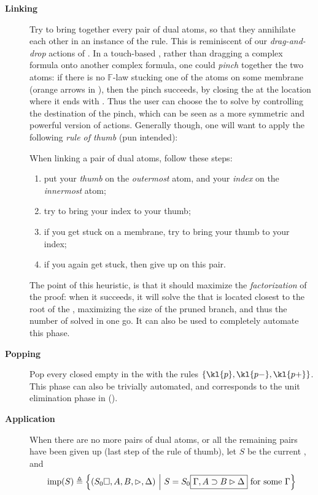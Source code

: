 \begin{description}
  \item[\textbf{Linking}] Try to bring together every pair of dual atoms, so
    that they annihilate each other in an instance of the 
    rule. This is reminiscent of our \emph{drag-and-drop} actions of
    . In a touch-based , rather than dragging a complex formula
    onto another complex formula, one could \emph{pinch} together the two atoms:
    if there is no $\mathbb{F}$-law stucking one of the atoms on some membrane
    (orange arrows in ), then the pinch succeeds, by
    closing the  at the location where it ends with
    . Thus the user can choose the  to solve by
    controlling the destination of the pinch, which can be seen as a more
    symmetric and powerful version of  actions. Generally though, one will
    want to apply the following \emph{rule of thumb} (pun intended):
    \begin{fact}
      When linking a pair of dual atoms, follow these steps:
      \begin{enumerate}
        \item put your \emph{thumb} on the \emph{outermost} atom, and your
              \emph{index} on the \emph{innermost} atom;
        \item try to bring your index to your thumb;
        \item if you get stuck on a membrane, try to bring your thumb to your
              index;
        \item if you again get stuck, then give up on this pair.
      \end{enumerate}
    \end{fact}
    The point of this heuristic, is that it should maximize the
    \emph{factorization} of the proof: when it succeeds, it will solve the
     that is located closest to the root of the , maximizing the size
    of the pruned branch, and thus the number of  solved in one go. It
    can also be used to completely automate this phase.

  \item[\textbf{Popping}] Pop every closed empty  in the  with the
  rules $\{\kl{p},\kl{p{-}},\kl{p{+}}\}$. This phase can also be trivially
  automated, and corresponds to the unit elimination phase in 
  ().

  \item[\textbf{Application}] When there are no more pairs of dual atoms, or all
    the remaining pairs have been given up (last step of the rule of thumb), let
    $S$ be the current , and
    $$\mathrm{imp}(S) \triangleq \left\{(S_0\square, A, B, \mathbin{\rhd}, \Delta) ~\middle|~ S = S_0\fbox{$\Gamma,
          A \supset B \mathbin{\rhd} \Delta$} \text{ for some $\Gamma$}\right\}$$


\end{description}
